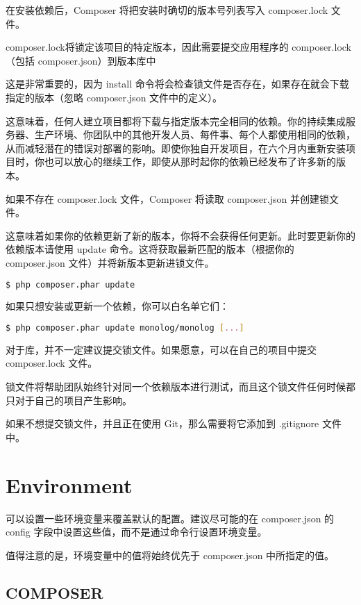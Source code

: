 在安装依赖后，Composer 将把安装时确切的版本号列表写入 composer.lock 文件。

composer.lock将锁定该项目的特定版本，因此需要提交应用程序的 composer.lock （包括 composer.json）到版本库中

这是非常重要的，因为 install 命令将会检查锁文件是否存在，如果存在就会下载指定的版本（忽略 composer.json 文件中的定义）。

这意味着，任何人建立项目都将下载与指定版本完全相同的依赖。你的持续集成服务器、生产环境、你团队中的其他开发人员、每件事、每个人都使用相同的依赖，从而减轻潜在的错误对部署的影响。即使你独自开发项目，在六个月内重新安装项目时，你也可以放心的继续工作，即使从那时起你的依赖已经发布了许多新的版本。

如果不存在 composer.lock 文件，Composer 将读取 composer.json 并创建锁文件。

这意味着如果你的依赖更新了新的版本，你将不会获得任何更新。此时要更新你的依赖版本请使用 update 命令。这将获取最新匹配的版本（根据你的 composer.json 文件）并将新版本更新进锁文件。

\begin{lstlisting}[language=bash]
$ php composer.phar update
\end{lstlisting}

如果只想安装或更新一个依赖，你可以白名单它们：

\begin{lstlisting}[language=bash]
$ php composer.phar update monolog/monolog [...]
\end{lstlisting}

对于库，并不一定建议提交锁文件。如果愿意，可以在自己的项目中提交 composer.lock 文件。

锁文件将帮助团队始终针对同一个依赖版本进行测试，而且这个锁文件任何时候都只对于自己的项目产生影响。

如果不想提交锁文件，并且正在使用 Git，那么需要将它添加到 .gitignore 文件中。



\section{Environment}


可以设置一些环境变量来覆盖默认的配置。建议尽可能的在 composer.json 的 config 字段中设置这些值，而不是通过命令行设置环境变量。

值得注意的是，环境变量中的值将始终优先于 composer.json 中所指定的值。

\subsection{COMPOSER}

